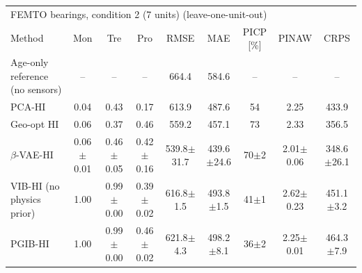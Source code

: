 \begin{tabular}{l c c c c c c c c}
\hline
\multicolumn{9}{l}{FEMTO bearings, condition 2 (7 units) (leave-one-unit-out)}\\
 Method & Mon & Tre & Pro & RMSE & MAE & PICP [\%] & PINAW & CRPS \\
\hline
Age-only reference (no sensors) & -- & -- & -- & 664.4 & 584.6 & -- & -- & -- \\
PCA-HI & 0.04 & 0.43 & 0.17 & 613.9 & 487.6 & 54 & 2.25 & 433.9 \\
Geo-opt HI & 0.06 & 0.37 & 0.46 & 559.2 & 457.1 & 73 & 2.33 & 356.5 \\
$\beta$-VAE-HI & 0.06$\pm$0.01 & 0.46$\pm$0.05 & 0.42$\pm$0.16 & 539.8$\pm$31.7 & 439.6$\pm$24.6 & 70$\pm$2 & 2.01$\pm$0.06 & 348.6$\pm$26.1 \\
VIB-HI (no physics prior) & 1.00 & 0.99$\pm$0.00 & 0.39$\pm$0.02 & 616.8$\pm$1.5 & 493.8$\pm$1.5 & 41$\pm$1 & 2.62$\pm$0.23 & 451.1$\pm$3.2 \\
PGIB-HI & 1.00 & 0.99$\pm$0.00 & 0.46$\pm$0.02 & 621.8$\pm$4.3 & 498.2$\pm$8.1 & 36$\pm$2 & 2.25$\pm$0.01 & 464.3$\pm$7.9 \\
\hline
\end{tabular}
